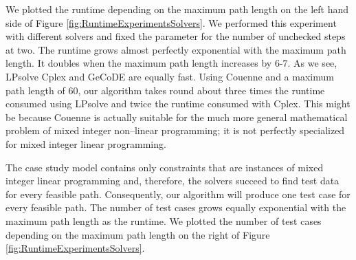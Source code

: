 \documentclass[runningheads,a4paper]{llncs}%
\begin{document}
We plotted the runtime depending on the maximum path length on the left hand side of Figure \ref{fig:RuntimeExperimentsSolvers}. We performed this experiment with different solvers and fixed the parameter for the number of unchecked steps at two. The runtime grows almost perfectly exponential with the maximum path length. It doubles when the maximum path length increases by $6$-$7$. As we see, LPsolve Cplex and GeCoDE are equally fast. Using Couenne and a maximum path length of 60, our algorithm takes round about three times the runtime consumed using LPsolve and twice the runtime consumed with Cplex. This might be because Couenne is actually suitable for the much more general mathematical problem of mixed integer non--linear programming; it is not perfectly specialized for mixed integer linear programming.

The case study model contains only constraints that are instances of mixed integer linear programming and, therefore, the solvers succeed to find test data for every feasible path. Consequently, our algorithm will produce one test case for every feasible path. The number of test cases grows equally exponential with the maximum path length as the runtime. We plotted the number of test cases depending on the maximum path length on the right of Figure \ref{fig:RuntimeExperimentsSolvers}.%
\end{document}
